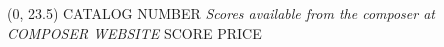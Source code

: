 \documentclass[10pt]{article}
\begin{document}
\begin{textblock}{23}(0, 23.5)
CATALOG NUMBER \hfill
\textit{Scores available from the composer at COMPOSER WEBSITE} \hfill
SCORE PRICE
\end{textblock}
\end{document}
